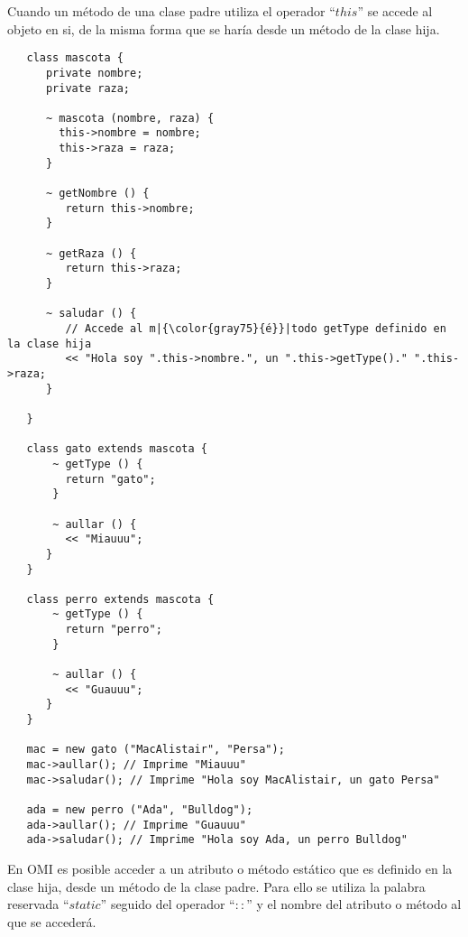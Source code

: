 Cuando un método de una clase padre utiliza el operador ``$this$'' se accede al objeto
en si, de la misma forma que se haría desde un método de la clase hija.  \\

\begin{lstlisting}
   class mascota {
      private nombre; 
      private raza;
      
      ~ mascota (nombre, raza) { 
        this->nombre = nombre; 
        this->raza = raza;
      }
      
      ~ getNombre () {
         return this->nombre;
      }
      
      ~ getRaza () {
         return this->raza;
      }
      
      ~ saludar () {
         // Accede al m|{\color{gray75}{é}}|todo getType definido en la clase hija
         << "Hola soy ".this->nombre.", un ".this->getType()." ".this->raza;  
      }
      
   }

   class gato extends mascota {
       ~ getType () {
         return "gato";
       }
       
       ~ aullar () { 
         << "Miauuu";
      }
   }

   class perro extends mascota {
       ~ getType () {
         return "perro";
       }
       
       ~ aullar () { 
         << "Guauuu";
      }
   }
   
   mac = new gato ("MacAlistair", "Persa"); 
   mac->aullar(); // Imprime "Miauuu"
   mac->saludar(); // Imprime "Hola soy MacAlistair, un gato Persa"
   
   ada = new perro ("Ada", "Bulldog"); 
   ada->aullar(); // Imprime "Guauuu"
   ada->saludar(); // Imprime "Hola soy Ada, un perro Bulldog"
\end{lstlisting}

En OMI es posible acceder a un atributo o método estático que es definido en la clase hija, desde un método de
la clase padre. Para ello se utiliza la palabra reservada ``$static$'' seguido del operador ``$::$'' y el 
nombre del atributo o método al que se accederá. \\

